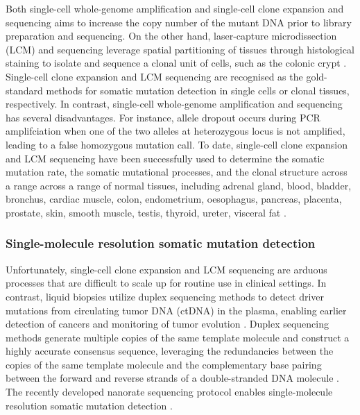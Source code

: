 Both single-cell whole-genome amplification \cite{Lodato2018-hh} and single-cell clone expansion and sequencing \cite{Lee-Six2018-qe, MSpencer_Chapman2021-cq} aims to increase the copy number of the mutant DNA prior to library preparation and sequencing. On the other hand, laser-capture microdissection (LCM) and sequencing leverage spatial partitioning of tissues through histological staining to isolate and sequence a clonal unit of cells, such as the colonic crypt \cite{Ellis2021-it}. Single-cell clone expansion and LCM sequencing are recognised as the gold-standard methods for somatic mutation detection in single cells or clonal tissues, respectively. In contrast, single-cell whole-genome amplification and sequencing has several disadvantages. For instance, allele dropout occurs during PCR amplifciation when one of the two alleles at heterozygous locus is not amplified, leading to a false homozygous mutation call. To date, single-cell clone expansion and LCM sequencing have been successfully used to determine the somatic mutation rate, the somatic mutational processes, and the clonal structure across a range across a range of normal tissues, including adrenal gland, blood, bladder, bronchus, cardiac muscle, colon, endometrium, oesophagus, pancreas, placenta, prostate, skin, smooth muscle, testis, thyroid, ureter, visceral fat \cite{Lee-Six2018-qe, MSpencer_Chapman2021-cq, Martincorena2015-gu, Ju2017-vw, Martincorena2018-av, Brunner2019-xg, Lee-Six2019-vt, Yoshida2020-yr, Olafsson2020-vi, Moore2020-pi, Lawson2020-em, Coorens2021-ct, Robinson2021-te, Grossmann2021-gd, Moore2021-dl, Park2021-fx, Ng2021-jd, Mitchell2022-ry}. 

\subsubsection{Single-molecule resolution somatic mutation detection}

Unfortunately, single-cell clone expansion and LCM sequencing are arduous processes that are difficult to scale up for routine use in clinical settings. In contrast, liquid biopsies utilize duplex sequencing methods to detect driver mutations from circulating tumor DNA (ctDNA) in the plasma, enabling earlier detection of cancers and monitoring of tumor evolution \cite{Newman2016-cy}. Duplex sequencing methods generate multiple copies of the same template molecule and construct a highly accurate consensus sequence, leveraging the redundancies between the copies of the same template molecule and the complementary base pairing between the forward and reverse strands of a double-stranded DNA molecule \cite{Schmitt2012-yr, Hoang2016-jx, Abascal2021-pk}. The recently developed nanorate sequencing protocol enables single-molecule resolution somatic mutation detection \cite{Abascal2021-pk}. 

